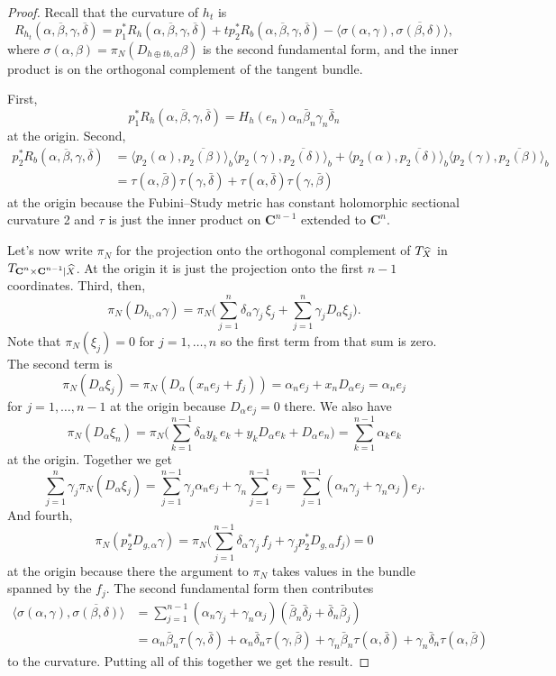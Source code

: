 \documentclass[10pt,a4paper]{amsart}
\def\CC{\mathbf{C}}
\def\<{\langle}
\def\>{\rangle}
\def\fs{b}
\def\ton{\alpha}
\def\ttw{\beta}
\def\tth{\gamma}
\def\tfo{\delta}
\def\ov#1{\overline{#1}}
\def\hsc{holomorphic sectional curvature}
\def\bl#1{\widehat{#1}}
\def\blX{\bl{X}}
\begin{document}
\begin{proof}
Recall that the curvature of $h_t$ is
$$
R_{h_t}(\alpha, \ov\beta, \gamma, \ov\delta)
= p_1^* R_h(\alpha, \ov\beta, \gamma, \ov\delta)
+ t p_2^* R_b(\alpha, \ov\beta, \gamma, \ov\delta)
- \<\sigma(\alpha, \gamma), \ov{\sigma(\beta, \delta)}\>,
$$
where $\sigma(\alpha, \beta) = \pi_N(D_{h \oplus t \fs,\alpha} \beta)$ is
the second fundamental form, and the inner product is on the orthogonal complement
of the tangent bundle.

First,
$$
p_1^*R_h(\alpha, \ov\beta, \gamma, \ov\delta)
= H_h(e_n) \ton_n \bar \ttw_n \tth_n \bar \tfo_n
$$
at the origin. Second,
\begin{align*}
p_2^*R_b(\alpha, \ov\beta, \gamma, \ov\delta)
&= \< p_2(\alpha), \ov{p_2(\beta)} \>_b
\< p_2(\gamma), \ov{p_2(\delta)} \>_b
+ \< p_2(\alpha), \ov{p_2(\delta)} \>_b
\< p_2(\gamma), \ov{p_2(\beta)} \>_b
\\
&= \tau(\ton, \bar \ttw) \tau(\tth, \bar \tfo) + \tau(\ton, \bar \tfo) \tau(\tth, \bar \ttw)
\end{align*}
at the origin
because the Fubini--Study metric has constant \hsc{} 2
and $\tau$ is just the inner product on $\CC^{n-1}$ extended to $\CC^n$.

Let's now write $\pi_N$ for the projection onto the orthogonal complement of
$T_{\smash{\blX}}$ in $T_{\smash{\CC^n \times \CC^{n-1}|\blX}}$.
At the origin it is just the projection onto the first $n-1$ coordinates.
Third, then,
$$
\pi_N(D_{h_t,\alpha} \gamma)
= \pi_N\biggl(
\sum_{j=1}^{n} \tfo_{\alpha} \tth_j \, \xi_j
+ \sum_{j=1}^n \tth_j D_{\alpha} \xi_j
\biggr).
$$
Note that $\pi_N(\xi_j) = 0$ for $j=1,\ldots,n$ so the first term from that sum
is zero. The second term is
$$
\pi_N(D_{\alpha} \xi_j)
= \pi_N(D_{\alpha}(x_n e_j + f_j))
= \ton_n e_j + x_n D_{\alpha} e_j
= \ton_n e_j
$$
for $j=1,\ldots,n-1$ at the origin because $D_{\alpha} e_j = 0$ there.
We also have
$$
\pi_N(D_{\alpha} \xi_n)
= \pi_N\biggl(
\sum_{k=1}^{n-1} \tfo_{\alpha} y_k \, e_k + y_k D_{\alpha} e_k
+ D_{\alpha} e_n
\biggr)
= \sum_{k=1}^{n-1} \ton_k e_k
$$
at the origin.
Together we get
$$
\sum_{j=1}^n \tth_j \pi_N(D_{\alpha} \xi_j)
= \sum_{j=1}^{n-1} \tth_j \ton_n e_j + \tth_n \sum_{j=1}^{n-1} e_j
= \sum_{j=1}^{n-1} (\ton_n \tth_j + \tth_n \ton_j) e_j.
$$
And fourth,
$$
\pi_N(p_2^*D_{g,\alpha} \gamma)
= \pi_N \biggl(
\sum_{j=1}^{n-1} \tfo_\alpha \tth_j \, f_j
+ \tth_j p_2^*D_{g,\alpha} f_j \biggr) = 0
$$
at the origin because there the argument to $\pi_N$ takes values in the bundle
spanned by the $f_j$.
The second fundamental form then contributes
\begin{align*}
\<\sigma(\alpha, \gamma), \ov{\sigma(\beta, \delta)}\>
&=
\sum_{j=1}^{n-1} (\ton_n \tth_j + \tth_n \ton_j) (\bar \ttw_n \bar \tfo_j + \bar \tfo_n \bar \ttw_j)
\\
&= \ton_n \bar \ttw_n \tau(\tth, \bar \tfo)
+ \ton_n \bar \tfo_n \tau(\tth, \bar \ttw)
+ \tth_n \bar \ttw_n \tau(\ton, \bar \tfo)
+ \tth_n \bar \tfo_n \tau(\ton, \bar \ttw)
\end{align*}
to the curvature. Putting all of this together we get the result.
\end{proof}
\end{document}
